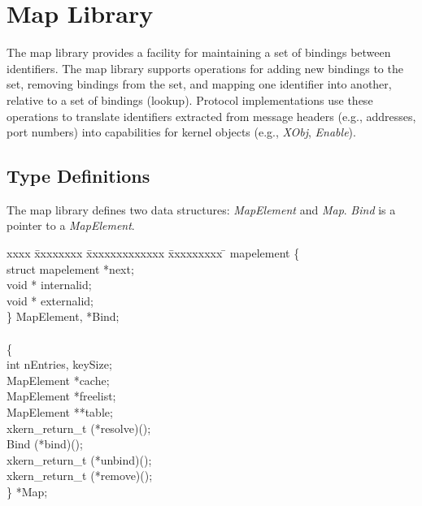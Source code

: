 % 
%
%
%
%
%

\section{Map Library}

The map library provides a facility for maintaining a set of bindings
between identifiers.  The map library supports operations for
adding new bindings to the set, removing bindings from the set, and
mapping one identifier into another, relative to a set of bindings (lookup).
Protocol implementations use these operations to translate identifiers
extracted from message headers (e.g., addresses, port numbers) into
capabilities for kernel objects (e.g., {\em XObj}, {\em Enable}).

\subsection{Type Definitions}

The map library defines two data structures: {\em MapElement}
and {\em Map}. {\em Bind} is a pointer to a {\em MapElement}.
\medskip

\begin{tabbing}
xxxx \= xxxxxxxx \= xxxxxxxxxxxxx \= xxxxxxxxx \= \kill
{} mapelement \{\\
\>\>  {\sem struct mapelement} \>\>*next;\\
\>\>  {\sem void *} \>internalid;\\
\>\>  {\sem void *} \>externalid;\\
\>\} {\bold MapElement}, *{\bold Bind};\\
\\
 \{\\
\>\>  {\sem int} \>nEntries, keySize;\\
\>\>  {\sem MapElement}  \>*cache;\\
\>\>  {\sem MapElement}  \>*freelist;\\
\>\>  {\sem MapElement}  \>**table;\\
\>\>  {\sem xkern\_return\_t} \>(*resolve)();\\
\>\>  {\sem Bind} \>(*bind)();\\
\>\>  {\sem xkern\_return\_t} \>(*unbind)();\\
\>\>  {\sem xkern\_return\_t} \>(*remove)();\\
\>\} *{\bold Map};
\end{tabbing}

